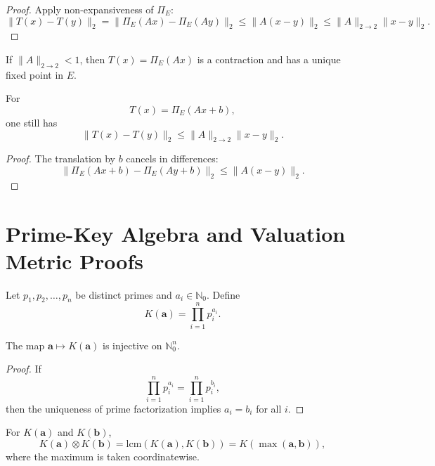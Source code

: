 \documentclass[11pt]{article}
\begin{document}
\begin{proof}
Apply non-expansiveness of \(\Pi_E\):
\[
\|T(x)-T(y)\|_2 = \|\Pi_E(Ax)-\Pi_E(Ay)\|_2 \le \|A(x-y)\|_2 \le \|A\|_{2\to 2}\|x-y\|_2. \tag{A25}
\]
\end{proof}

\begin{corollary}
If \(\|A\|_{2\to 2}<1\), then \(T(x)=\Pi_E(Ax)\) is a contraction and has a unique fixed point in \(E\).
\end{corollary}

\begin{proposition}
For
\[
T(x)=\Pi_E(Ax+b), \tag{A26}
\]
one still has
\[
\|T(x)-T(y)\|_2 \le \|A\|_{2\to 2}\|x-y\|_2. \tag{A27}
\]
\end{proposition}

\begin{proof}
The translation by \(b\) cancels in differences:
\[
\|\Pi_E(Ax+b)-\Pi_E(Ay+b)\|_2 \le \|A(x-y)\|_2. \tag{A28}
\]
\end{proof}

\section{Prime-Key Algebra and Valuation Metric Proofs}
\begin{definition}
Let \(p_1,p_2,\dots,p_n\) be distinct primes and \(a_i \in \mathbb{N}_0\). Define
\[
K(\mathbf{a}) = \prod_{i=1}^n p_i^{a_i}. \tag{A29}
\]
\end{definition}

\begin{proposition}
The map \(\mathbf{a} \mapsto K(\mathbf{a})\) is injective on \(\mathbb{N}_0^n\).
\end{proposition}

\begin{proof}
If
\[
\prod_{i=1}^n p_i^{a_i} = \prod_{i=1}^n p_i^{b_i}, \tag{A30}
\]
then the uniqueness of prime factorization implies \(a_i=b_i\) for all \(i\).
\end{proof}

\begin{proposition}
For \(K(\mathbf{a})\) and \(K(\mathbf{b})\),
\[
K(\mathbf{a}) \otimes K(\mathbf{b}) = \mathrm{lcm}(K(\mathbf{a}),K(\mathbf{b})) = K(\max(\mathbf{a},\mathbf{b})), \tag{A31}
\]
where the maximum is taken coordinatewise.
\end{proposition}
\end{document}
